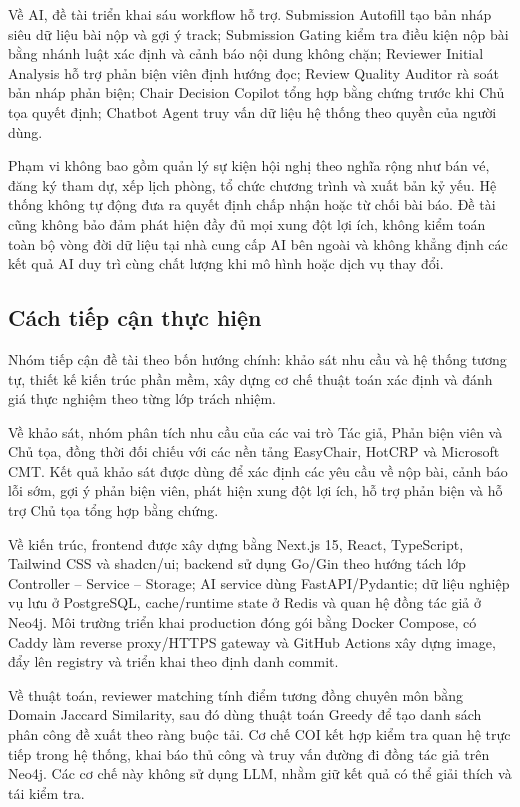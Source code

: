 \documentclass[12pt,a4paper]{article}
\begin{document}
Về AI, đề tài triển khai sáu workflow hỗ trợ. Submission Autofill tạo bản nháp siêu dữ liệu bài nộp và gợi ý track; Submission Gating kiểm tra điều kiện nộp bài bằng nhánh luật xác định và cảnh báo nội dung không chặn; Reviewer Initial Analysis hỗ trợ phản biện viên định hướng đọc; Review Quality Auditor rà soát bản nháp phản biện; Chair Decision Copilot tổng hợp bằng chứng trước khi Chủ tọa quyết định; Chatbot Agent truy vấn dữ liệu hệ thống theo quyền của người dùng.

Phạm vi không bao gồm quản lý sự kiện hội nghị theo nghĩa rộng như bán vé, đăng ký tham dự, xếp lịch phòng, tổ chức chương trình và xuất bản kỷ yếu. Hệ thống không tự động đưa ra quyết định chấp nhận hoặc từ chối bài báo. Đề tài cũng không bảo đảm phát hiện đầy đủ mọi xung đột lợi ích, không kiểm toán toàn bộ vòng đời dữ liệu tại nhà cung cấp AI bên ngoài và không khẳng định các kết quả AI duy trì cùng chất lượng khi mô hình hoặc dịch vụ thay đổi.

\subsection{Cách tiếp cận thực hiện}
\justifying

Nhóm tiếp cận đề tài theo bốn hướng chính: khảo sát nhu cầu và hệ thống tương tự, thiết kế kiến trúc phần mềm, xây dựng cơ chế thuật toán xác định và đánh giá thực nghiệm theo từng lớp trách nhiệm.

Về khảo sát, nhóm phân tích nhu cầu của các vai trò Tác giả, Phản biện viên và Chủ tọa, đồng thời đối chiếu với các nền tảng EasyChair, HotCRP và Microsoft CMT. Kết quả khảo sát được dùng để xác định các yêu cầu về nộp bài, cảnh báo lỗi sớm, gợi ý phản biện viên, phát hiện xung đột lợi ích, hỗ trợ phản biện và hỗ trợ Chủ tọa tổng hợp bằng chứng.

Về kiến trúc, frontend được xây dựng bằng Next.js 15, React, TypeScript, Tailwind CSS và shadcn/ui; backend sử dụng Go/Gin theo hướng tách lớp Controller -- Service -- Storage; AI service dùng FastAPI/Pydantic; dữ liệu nghiệp vụ lưu ở PostgreSQL, cache/runtime state ở Redis và quan hệ đồng tác giả ở Neo4j. Môi trường triển khai production đóng gói bằng Docker Compose, có Caddy làm reverse proxy/HTTPS gateway và GitHub Actions xây dựng image, đẩy lên registry và triển khai theo định danh commit.

Về thuật toán, reviewer matching tính điểm tương đồng chuyên môn bằng Domain Jaccard Similarity, sau đó dùng thuật toán Greedy để tạo danh sách phân công đề xuất theo ràng buộc tải. Cơ chế COI kết hợp kiểm tra quan hệ trực tiếp trong hệ thống, khai báo thủ công và truy vấn đường đi đồng tác giả trên Neo4j. Các cơ chế này không sử dụng LLM, nhằm giữ kết quả có thể giải thích và tái kiểm tra.
\end{document}
